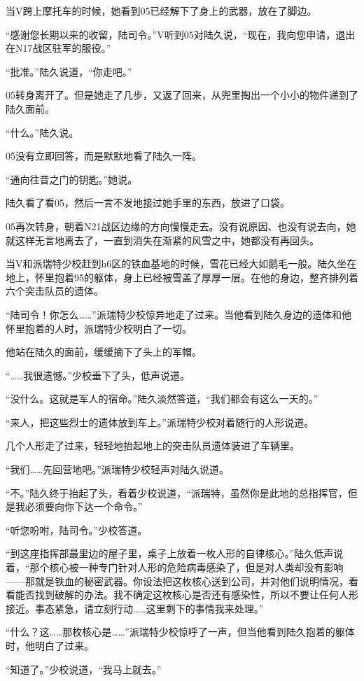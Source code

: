 当V跨上摩托车的时候，她看到05已经解下了身上的武器，放在了脚边。

“感谢您长期以来的收留，陆司令。”V听到05对陆久说，“现在，我向您申请，退出在N17战区驻军的服役。”

“批准。”陆久说道，“你走吧。”

05转身离开了。但是她走了几步，又返了回来，从兜里掏出一个小小的物件递到了陆久面前。

“什么。”陆久说。

05没有立即回答，而是默默地看了陆久一阵。

“通向往昔之门的钥匙。”她说。

陆久看了看05，然后一言不发地接过她手里的东西，放进了口袋。

05再次转身，朝着N21战区边缘的方向慢慢走去。没有说原因、也没有说去向，她就这样无言地离去了，一直到消失在渐紧的风雪之中，她都没有再回头。

当V和派瑞特少校赶到h6区的铁血基地的时候，雪花已经大如鹅毛一般。陆久坐在地上，怀里抱着95的躯体，身上已经被雪盖了厚厚一层。在他的身边，整齐排列着六个突击队员的遗体。

“陆司令！你怎么……”派瑞特少校惊异地走了过来。当他看到陆久身边的遗体和他怀里抱着的人时，派瑞特少校明白了一切。

他站在陆久的面前，缓缓摘下了头上的军帽。

“……我很遗憾。”少校垂下了头，低声说道。

“没什么。这就是军人的宿命。”陆久淡然答道，“我们都会有这么一天的。”

“来人，把这些烈士的遗体放到车上。”派瑞特少校对着随行的人形说道。

几个人形走了过来，轻轻地抬起地上的突击队员遗体装进了车辆里。

“我们……先回营地吧。”派瑞特少校轻声对陆久说道。

“不。”陆久终于抬起了头，看着少校说道，“派瑞特，虽然你是此地的总指挥官，但是我必须要向你下达一个命令。”

“听您吩咐，陆司令。”少校答道。

“到这座指挥部最里边的屋子里，桌子上放着一枚人形的自律核心。”陆久低声说着，“那个核心被一种专门针对人形的危险病毒感染了，但是对人类却没有影响——那就是铁血的秘密武器。你设法把这枚核心送到公司，并对他们说明情况，看看能否找到破解的办法。我不确定这枚核心是否还有感染性，所以不要让任何人形接近。事态紧急，请立刻行动……这里剩下的事情我来处理。”

“什么？这……那枚核心是……”派瑞特少校惊呼了一声，但当他看到陆久抱着的躯体时，他明白了过来。

“知道了。”少校说道，“我马上就去。”

